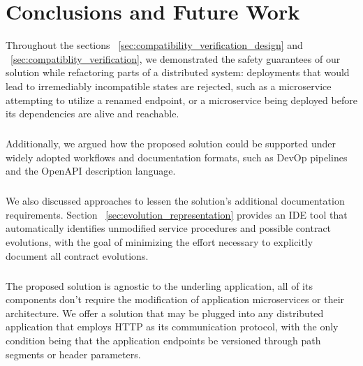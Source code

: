
%

\chapter{Conclusions and Future Work}
\label{cha:conclusions and future work}

Throughout the sections ~\ref{sec:compatibility_verification_design} and ~\ref{sec:compatiblity_verification}, we demonstrated the safety guarantees of our solution while refactoring parts of a distributed system:
deployments that would lead to irremediably incompatible states are rejected, such as a
microservice attempting to utilize a renamed endpoint, or a microservice being deployed before its dependencies are alive and reachable.

\paragraph{}

Additionally, we argued how the proposed solution could be supported under widely adopted workflows and documentation formats, such as DevOp pipelines and the OpenAPI description language.

\paragraph{}

We also discussed approaches to lessen the solution's additional documentation requirements.
Section ~\ref{sec:evolution_representation} provides an IDE tool that automatically identifies unmodified service procedures and possible contract evolutions,
with the goal of minimizing the effort necessary to explicitly document all contract evolutions.

\paragraph{}

The proposed solution is agnostic to the underling application, all of its components don't require the modification of application microservices or their architecture.
We offer a solution that may be plugged into any distributed application that employs HTTP as its communication protocol, with the only condition being that the application endpoints be versioned through path segments or header parameters.

